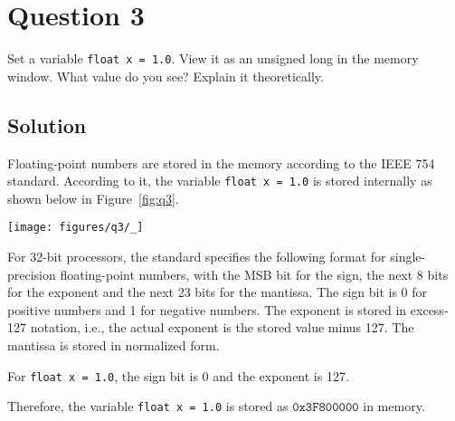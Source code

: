 \section*{Question 3}

Set a variable \verb|float x = 1.0|.
View it as an unsigned long in the memory window.
What value do you see?
Explain it theoretically.

\subsection*{Solution}

Floating-point numbers are stored in the memory according to the IEEE 754 standard.
According to it, the variable \texttt{float x = 1.0} is stored internally as shown below in Figure~\ref{fig:q3}.

\begin{figure*}[htb]
    \centering
    \texttt{[image: figures/q3/\_]}
    \caption{
        Memory representation of \texttt{float x = 1.0} according to the IEEE 754 standard.
    }\label{fig:q3}
\end{figure*}

For 32-bit processors, the standard specifies the following format for single-precision floating-point numbers, with the MSB bit for the sign, the next 8 bits for the exponent and the next 23 bits for the mantissa.
The sign bit is 0 for positive numbers and 1 for negative numbers.
The exponent is stored in excess-127 notation, i.e., the actual exponent is the stored value minus 127.
The mantissa is stored in normalized form.

For \texttt{float x = 1.0}, the sign bit is 0 and the exponent is 127.

Therefore, the variable \texttt{float x = 1.0} is stored as \(\boxed{\texttt{0x3F800000}}\) in memory.
